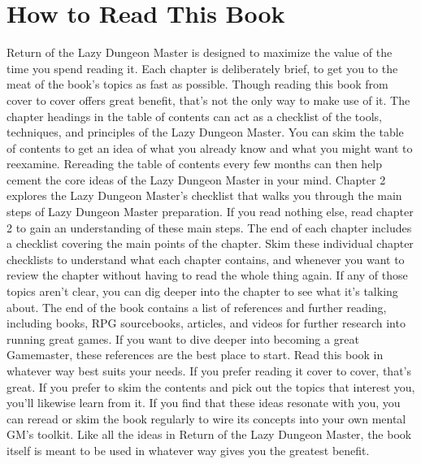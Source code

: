 \documentclass[10pt,a4paper,twoside,bg=print,twocolumn,openany,nodeprecatedcode]{dndbook}
\begin{document}
\section{How to Read This Book}
Return of the Lazy Dungeon Master is designed to maximize the value of the time you spend reading it. Each chapter is deliberately brief, to get you to the meat of the book's topics as fast as possible. Though reading this book from cover to cover offers great benefit, that's not the only way to make use of it.
The chapter headings in the table of contents can act as a checklist of the tools, techniques, and principles of the Lazy Dungeon Master. You can skim the table of contents to get an idea of what you already know and what you might want to reexamine. Rereading the table of contents every few months can then help cement the core ideas of the Lazy Dungeon Master in your mind.
Chapter 2 explores the Lazy Dungeon Master's checklist that walks you through the main steps of Lazy Dungeon Master preparation. If you read nothing else, read chapter 2 to gain an understanding of these main steps.
The end of each chapter includes a checklist covering the main points of the chapter. Skim these individual chapter checklists to understand what each chapter contains, and whenever you want to review the chapter without having to read the whole thing again. If any of those topics aren't clear, you can dig deeper into the chapter to see what it's talking about.
The end of the book contains a list of references and further reading, including books, RPG sourcebooks, articles, and videos for further research into running great games. If you want to dive deeper into becoming a great Gamemaster, these references are the best place to start.
Read this book in whatever way best suits your needs. If you prefer reading it cover to cover, that's great. If you prefer to skim the contents and pick out the topics that interest you, you'll likewise learn from it. If you find that these ideas resonate with you, you can reread or skim the book regularly to wire its concepts into your own mental GM's toolkit. Like all the ideas in Return of the Lazy Dungeon Master, the book itself is meant to be used in whatever way gives you the greatest benefit. 
\end{document}
